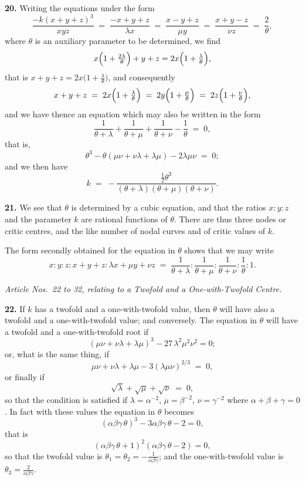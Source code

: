 \documentclass[11pt,a4paper]{article}
\begin{document}
\medskip

\textbf{20.} Writing the equations under the form
\[
\frac{-k(x + y + z)^3}{xyz} \;=\; \frac{-x + y + z}{\lambda x} \;=\; \frac{x - y + z}{\mu y} \;=\; \frac{x + y - z}{\nu z} \;=\; \frac{2}{\theta},
\]
where $\theta$ is an auxiliary parameter to be determined, we find
\[
x\Bigl(1 + \tfrac{2\lambda}{\theta}\Bigr) + y + z = 2x\Bigl(1 + \tfrac{\lambda}{\theta}\Bigr),
\]
that is $x + y + z = 2x\bigl(1 + \tfrac{\lambda}{\theta}\bigr)$, and consequently
\[
x + y + z \;=\; 2x\Bigl(1 + \tfrac{\lambda}{\theta}\Bigr) \;=\; 2y\Bigl(1 + \tfrac{\mu}{\theta}\Bigr) \;=\; 2z\Bigl(1 + \tfrac{\nu}{\theta}\Bigr),
\]
and we have thence an equation which may also be written in the form
\[
\frac{1}{\theta + \lambda} + \frac{1}{\theta + \mu} + \frac{1}{\theta + \nu} - \frac{1}{\theta} \;=\; 0,
\]
that is,
\[
\theta^3 - \theta(\mu\nu + \nu\lambda + \lambda\mu) - 2\lambda\mu\nu \;=\; 0;
\]
and we then have
\[
k \;=\; -\frac{\tfrac{1}{2}\theta^3}{(\theta + \lambda)(\theta + \mu)(\theta + \nu)}.
\]

\medskip

\textbf{21.} We see that $\theta$ is determined by a cubic equation, and that the ratios $x : y : z$ and the parameter $k$ are rational functions of $\theta$. There are thus three nodes or critic centres, and the like number of nodal curves and of critic values of $k$.

The form secondly obtained for the equation in $\theta$ shows that we may write
\[
x : y : z : x + y + z : \lambda x + \mu y + \nu z \;=\; \frac{1}{\theta + \lambda} : \frac{1}{\theta + \mu} : \frac{1}{\theta + \nu} : \frac{1}{\theta} : 1.
\]

\begin{center}
\textit{Article Nos.~22 to 32, relating to a Twofold and a One-with-Twofold Centre.}
\end{center}

\textbf{22.} If $k$ has a twofold and a one-with-twofold value, then $\theta$ will have also a twofold and a one-with-twofold value; and conversely. The equation in $\theta$ will have a twofold and a one-with-twofold root if
\[
(\mu\nu + \nu\lambda + \lambda\mu)^3 - 27\,\lambda^2\mu^2\nu^2 = 0;
\]
or, what is the same thing, if
\[
\mu\nu + \nu\lambda + \lambda\mu - 3(\lambda\mu\nu)^{2/3} \;=\; 0,
\]
or finally if
\[
\sqrt{\lambda} + \sqrt{\mu} + \sqrt{\nu} \;=\; 0,
\]
so that the condition is satisfied if $\lambda = \alpha^{-2}$, $\mu = \beta^{-2}$, $\nu = \gamma^{-2}$ where $\alpha + \beta + \gamma = 0$. In fact with these values the equation in $\theta$ becomes
\[
(\alpha\beta\gamma\,\theta)^3 - 3\alpha\beta\gamma\,\theta - 2 = 0,
\]
that is
\[
(\alpha\beta\gamma\,\theta + 1)^2(\alpha\beta\gamma\,\theta - 2) = 0,
\]
so that the twofold value is $\theta_1 = \theta_2 = -\tfrac{1}{\alpha\beta\gamma}$; and the one-with-twofold value is $\theta_3 = \tfrac{2}{\alpha\beta\gamma}$.
\end{document}
